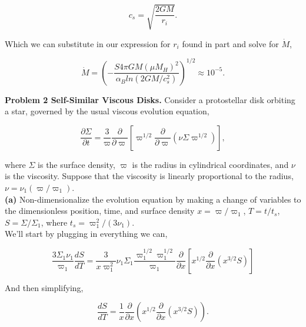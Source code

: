 \documentclass[12pt]{article}
\begin{document}
\begin{equation}
c_s = \sqrt{\frac{2GM}{r_i}}.
\end{equation}

\noindent Which we can substitute in our expression for $r_i$ found in part and solve for $\dot{M}$,

\begin{equation}
\dot{M} = \left( - \frac{ S 4 \pi GM \left( \mu M_H \right)^2 }{\alpha_B ln \left( 2GM/c_s^2\right) } \right)^{1/2} \approx 10^{-5}.
\end{equation}



\noindent \textbf{Problem 2 Self-Similar Viscous Disks.} Consider a protostellar disk orbiting a star, governed by the usual viscous evolution equation,

\begin{equation}
\frac{\partial \Sigma}{\partial t} = \frac{3}{\varpi} \frac{\partial}{\partial \varpi} \left [ \varpi^{1/2} \frac{\partial}{\partial \varpi} \left(\nu \Sigma \varpi^{1/2} \right) \right], 
\end{equation}

\noindent where $\Sigma$ is the surface density, $\varpi$ is the radius in cylindrical coordinates, and $\nu$ is the viscosity. Suppose that the viscosity is linearly proportional to the radius, $\nu = \nu_1 \left( \varpi / \varpi_1 \right)$. \\

\noindent \textbf{(a)} Non-dimensionalize the evolution equation by making a change of variables to the dimensionless position, time, and surface density $x = \varpi / \varpi_1$, $T = t/t_s$, $S = \Sigma/ \Sigma_1$, where $t_s = \varpi_1^2 / \left( 3\nu_1\right)$. \\

\noindent We'll start by plugging in everything we can,

\begin{equation}
\frac{3 \Sigma_1 \nu_1}{\varpi_1} \frac{dS}{dT} = \frac{3}{x \varpi_1^2} \nu_1 \Sigma_1 \frac{\varpi_1^{1/2} \varpi_1^{1/2}}{\varpi_1} \frac{\partial}{\partial x} \left [ x^{1/2} \frac{\partial}{\partial x} \left ( x^{3/2} S \right) \right]
\end{equation}

\noindent And then simplifying, 

\begin{equation}
\frac{dS}{dT} = \frac{1}{x} \frac{\partial}{\partial x} \left( x^{1/2} \frac{\partial}{\partial x} \left( x^{3/2} S\right) \right).
\end{equation}
\end{document}
